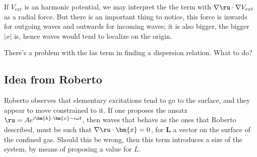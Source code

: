 \documentclass[10pt,letterpaper]{article}
\begin{document}
If $V_{ext}$ is an harmonic potential, we may interpret the the term with $\nabla\ru\cdot\nabla V_{ext}$ as a radial force. But there is an important thing to notice, this force is inwards for outgoing waves and outwards for incoming waves; it is also bigger, the bigger $|x|$ is, hence waves would tend to localize on the origin.

There's a problem with the las term in finding a dispersion relation. What to do?

\subsection*{Idea from Roberto}
Roberto observes that elementary excitations tend to go to the surface, and they appear to move constrained to it. If one proposes the ansatz $\ru = Ae^{i\bm{k}\cdot\bm{x} - i\omega t}$, then waves that behave as the ones that Roberto described, must be such that $\nabla \ru\cdot\bm{x} = 0$, for $\bm{L}$ a vector on the surface of the confined gas. Should this be wrong, then this term introduces a size of the system, by means of proposing a value for $L$.
\end{document}
